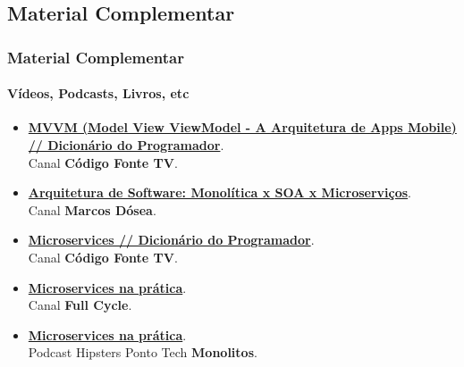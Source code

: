\documentclass[
	10pt, %
	t, %
]{beamer}
\begin{document}

\subsection{Material Complementar}

\begin{frame}
	\frametitle{Material Complementar}
	\framesubtitle{Vídeos, Podcasts, Livros, etc}
	
	\begin{itemize}
		\item \href{https://youtu.be/B2pJWtSyVFA}{\textbf{MVVM (Model View ViewModel - A Arquitetura de Apps Mobile) // Dicionário do Programador}}.\\Canal \textbf{Código Fonte TV}.
		\item \href{https://youtu.be/suZfVAk7hco}{\textbf{Arquitetura de Software: Monolítica x SOA x Microserviços}}.\\Canal \textbf{Marcos Dósea}.
		\item \href{https://www.youtube.com/watch?v=_2bDOCTnbKc}{\textbf{Microservices // Dicionário do Programador}}.\\Canal \textbf{Código Fonte TV}.
		\item \href{https://youtu.be/gtv9szE_P1U}{\textbf{Microservices na prática}}.\\Canal \textbf{Full Cycle}.
		\item \href{https://www.hipsters.tech/uma-linguagem-para-cada-combate-hipsters-ponto-tech-277}{\textbf{Microservices na prática}}.\\Podcast Hipsters Ponto Tech \textbf{Monolitos}.
	\end{itemize}
	
\end{frame}





		
\end{document}
